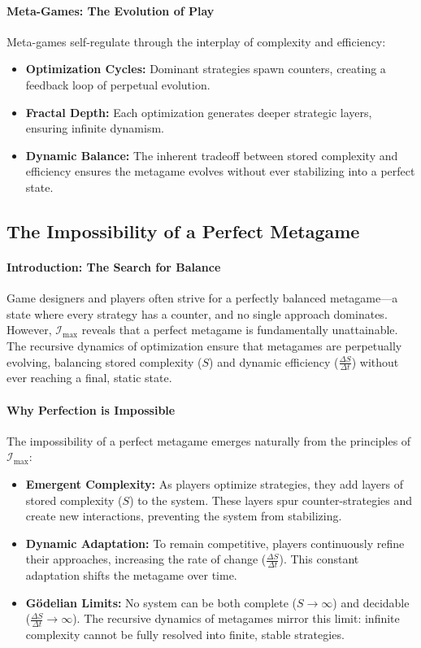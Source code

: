 \documentclass[12pt]{article}
\begin{document}
\paragraph{Meta-Games: The Evolution of Play}
Meta-games self-regulate through the interplay of complexity and efficiency:
\begin{itemize}
    \item \textbf{Optimization Cycles:} Dominant strategies spawn counters, creating a feedback loop of perpetual evolution.
    \item \textbf{Fractal Depth:} Each optimization generates deeper strategic layers, ensuring infinite dynamism.
    \item \textbf{Dynamic Balance:} The inherent tradeoff between stored complexity and efficiency ensures the metagame evolves without ever stabilizing into a perfect state.
\end{itemize}

\subsection{The Impossibility of a Perfect Metagame}

\paragraph{Introduction: The Search for Balance}
Game designers and players often strive for a perfectly balanced metagame—a state where every strategy has a counter, and no single approach dominates. However, \(\mathcal{I}_{\text{max}}\) reveals that a perfect metagame is fundamentally unattainable. The recursive dynamics of optimization ensure that metagames are perpetually evolving, balancing stored complexity (\(S\)) and dynamic efficiency (\(\frac{\Delta S}{\Delta t}\)) without ever reaching a final, static state.

\paragraph{Why Perfection is Impossible}
The impossibility of a perfect metagame emerges naturally from the principles of \(\mathcal{I}_{\text{max}}\):
\begin{itemize}
    \item \textbf{Emergent Complexity:} As players optimize strategies, they add layers of stored complexity (\(S\)) to the system. These layers spur counter-strategies and create new interactions, preventing the system from stabilizing.
    \item \textbf{Dynamic Adaptation:} To remain competitive, players continuously refine their approaches, increasing the rate of change (\(\frac{\Delta S}{\Delta t}\)). This constant adaptation shifts the metagame over time.
    \item \textbf{Gödelian Limits:} No system can be both complete (\(S \to \infty\)) and decidable (\(\frac{\Delta S}{\Delta t} \to \infty\)). The recursive dynamics of metagames mirror this limit: infinite complexity cannot be fully resolved into finite, stable strategies.
\end{itemize}
\end{document}
